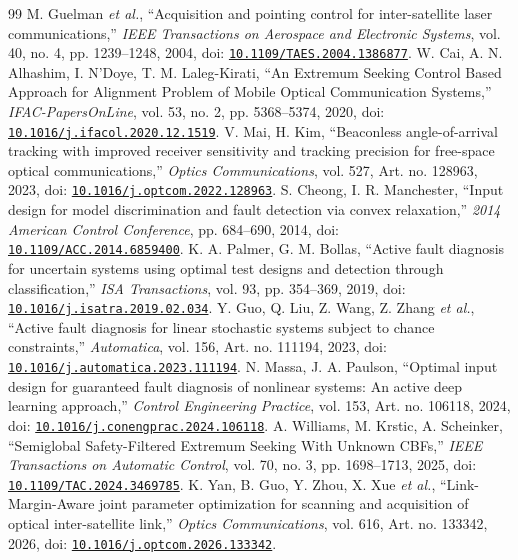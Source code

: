 \begin{thebibliography}{99}
 M. Guelman \emph{et al.}, ``Acquisition and pointing control for inter-satellite laser communications,'' \emph{IEEE Transactions on Aerospace and Electronic Systems}, vol. 40, no. 4, pp. 1239--1248, 2004, doi: \href{https://doi.org/10.1109/TAES.2004.1386877}{\nolinkurl{10.1109/TAES.2004.1386877}}.
 W. Cai, A. N. Alhashim, I. N’Doye, T. M. Laleg-Kirati, ``An Extremum Seeking Control Based Approach for Alignment Problem of Mobile Optical Communication Systems,'' \emph{IFAC-PapersOnLine}, vol. 53, no. 2, pp. 5368--5374, 2020, doi: \href{https://doi.org/10.1016/j.ifacol.2020.12.1519}{\nolinkurl{10.1016/j.ifacol.2020.12.1519}}.
 V. Mai, H. Kim, ``Beaconless angle-of-arrival tracking with improved receiver sensitivity and tracking precision for free-space optical communications,'' \emph{Optics Communications}, vol. 527, Art. no. 128963, 2023, doi: \href{https://doi.org/10.1016/j.optcom.2022.128963}{\nolinkurl{10.1016/j.optcom.2022.128963}}.
 S. Cheong, I. R. Manchester, ``Input design for model discrimination and fault detection via convex relaxation,'' \emph{2014 American Control Conference}, pp. 684--690, 2014, doi: \href{https://doi.org/10.1109/ACC.2014.6859400}{\nolinkurl{10.1109/ACC.2014.6859400}}.
 K. A. Palmer, G. M. Bollas, ``Active fault diagnosis for uncertain systems using optimal test designs and detection through classification,'' \emph{ISA Transactions}, vol. 93, pp. 354--369, 2019, doi: \href{https://doi.org/10.1016/j.isatra.2019.02.034}{\nolinkurl{10.1016/j.isatra.2019.02.034}}.
 Y. Guo, Q. Liu, Z. Wang, Z. Zhang \emph{et al.}, ``Active fault diagnosis for linear stochastic systems subject to chance constraints,'' \emph{Automatica}, vol. 156, Art. no. 111194, 2023, doi: \href{https://doi.org/10.1016/j.automatica.2023.111194}{\nolinkurl{10.1016/j.automatica.2023.111194}}.
 N. Massa, J. A. Paulson, ``Optimal input design for guaranteed fault diagnosis of nonlinear systems: An active deep learning approach,'' \emph{Control Engineering Practice}, vol. 153, Art. no. 106118, 2024, doi: \href{https://doi.org/10.1016/j.conengprac.2024.106118}{\nolinkurl{10.1016/j.conengprac.2024.106118}}.
 A. Williams, M. Krstic, A. Scheinker, ``Semiglobal Safety-Filtered Extremum Seeking With Unknown CBFs,'' \emph{IEEE Transactions on Automatic Control}, vol. 70, no. 3, pp. 1698--1713, 2025, doi: \href{https://doi.org/10.1109/TAC.2024.3469785}{\nolinkurl{10.1109/TAC.2024.3469785}}.
 K. Yan, B. Guo, Y. Zhou, X. Xue \emph{et al.}, ``Link-Margin-Aware joint parameter optimization for scanning and acquisition of optical inter-satellite link,'' \emph{Optics Communications}, vol. 616, Art. no. 133342, 2026, doi: \href{https://doi.org/10.1016/j.optcom.2026.133342}{\nolinkurl{10.1016/j.optcom.2026.133342}}.

\end{thebibliography}
